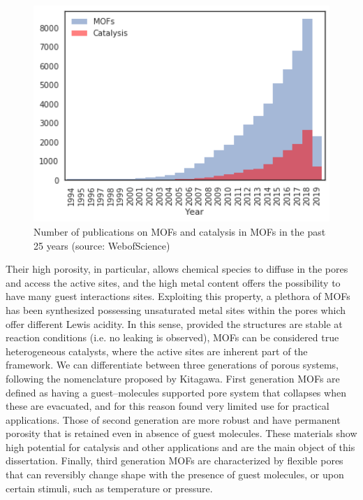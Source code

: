 \begin{figure}[htbp]
	\centering
 	\includegraphics[width=1.0\textwidth]{citation_report}
	\caption{Number of publications on MOFs and catalysis in MOFs in the past 25 years (source: WebofScience)}
	\label{fig:citation_report}
\end{figure}
Their high porosity, in particular, allows chemical species to diffuse in the pores and access the active sites, and the high metal content offers the possibility to have many guest interactions sites. Exploiting this property, a plethora of MOFs has been synthesized possessing unsaturated metal sites within the pores which offer different Lewis acidity. In this sense, provided the structures are stable at reaction conditions (i.e. no leaking is observed), MOFs can be considered true heterogeneous catalysts, where the active sites are inherent part of the framework. 
We can differentiate between three generations of porous systems, following the nomenclature proposed by Kitagawa\cite{kitagawa1998functional}. First generation MOFs are defined as having a guest--molecules supported pore system that collapses when these are evacuated, and for this reason found very limited use for practical applications. Those of second generation are more robust and have permanent porosity that is retained even in absence of guest molecules. These materials show high potential for catalysis and other applications and are the main object of this dissertation. Finally, third generation MOFs are characterized by flexible pores that can reversibly change shape with the presence of guest molecules, or upon certain stimuli, such as temperature or pressure. 

